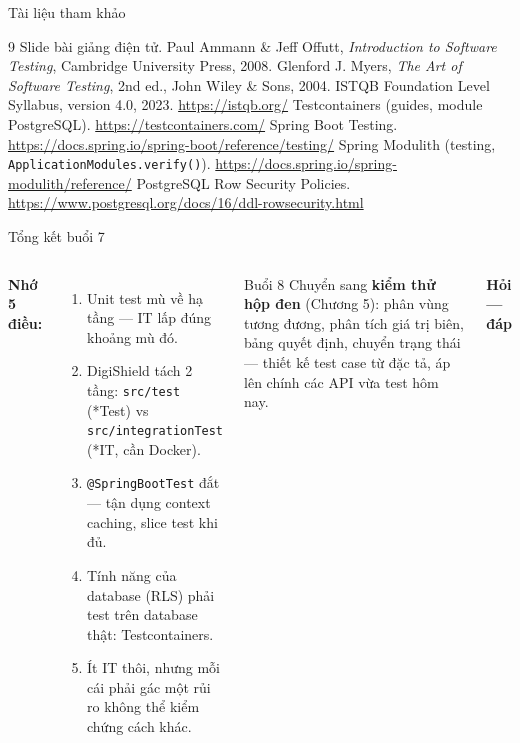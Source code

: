 \documentclass[aspectratio=169,12pt]{beamer}
\begin{document}
\begin{frame}{Tài liệu tham khảo}
  \vspace*{-0.4em}
  \footnotesize
  \begin{thebibliography}{9}
     Slide bài giảng điện tử.
     Paul Ammann \& Jeff Offutt, \emph{Introduction to Software
      Testing}, Cambridge University Press, 2008.
     Glenford J. Myers, \emph{The Art of Software Testing},
      2nd ed., John Wiley \& Sons, 2004.
     ISTQB Foundation Level Syllabus, version 4.0, 2023.
      \url{https://istqb.org/}
     Testcontainers (guides, module PostgreSQL).
      \url{https://testcontainers.com/}
     Spring Boot Testing.
      \url{https://docs.spring.io/spring-boot/reference/testing/}
     Spring Modulith (testing,
      \texttt{ApplicationModules.verify()}).
      \url{https://docs.spring.io/spring-modulith/reference/}
     PostgreSQL Row Security Policies.
      \url{https://www.postgresql.org/docs/16/ddl-rowsecurity.html}
  \end{thebibliography}
\end{frame}

\begin{frame}{Tổng kết buổi 7}
  \begin{columns}[t]
    \textbf{Nhớ 5 điều:}
    \begin{enumerate}\small
      \item Unit test mù về hạ tầng --- IT lấp đúng khoảng mù đó.
      \item DigiShield tách 2 tầng: \texttt{src/test} (*Test) vs
        \texttt{src/integrationTest} (*IT, cần Docker).
      \item \texttt{@SpringBootTest} đắt --- tận dụng context caching,
        slice test khi đủ.
      \item Tính năng của database (RLS) phải test trên database thật:
        Testcontainers.
      \item Ít IT thôi, nhưng mỗi cái phải gác một rủi ro không thể kiểm
        chứng cách khác.
    \end{enumerate}
    \begin{block}{Buổi 8}
      Chuyển sang \textbf{kiểm thử hộp đen} (Chương 5): phân vùng tương
      đương, phân tích giá trị biên, bảng quyết định, chuyển trạng thái ---
      thiết kế test case từ đặc tả, áp lên chính các API vừa test hôm nay.
    \end{block}
    \begin{center}
      \vspace{0.4em}
      {\large \textbf{Hỏi --- đáp}}
    \end{center}
  \end{columns}
\end{frame}
\end{document}
